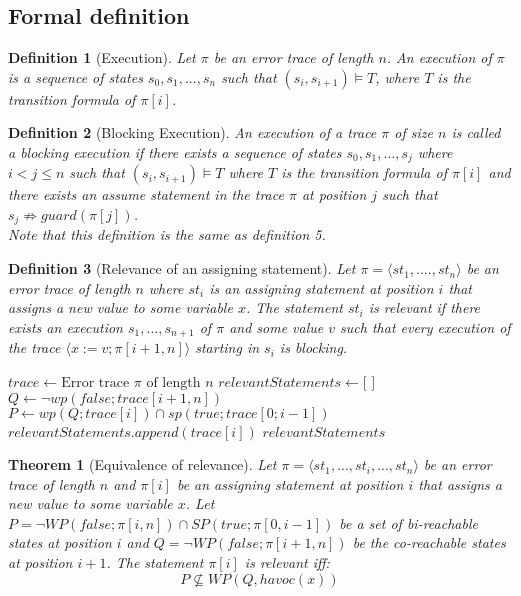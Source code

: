 \documentclass{article}
\newcommand{\limp}{\Rightarrow}
\newtheorem{mydef}{Definition}
\newtheorem{theorem}{Theorem}
\begin{document}
\subsection{Formal definition}
\begin{mydef}[Execution]\label{mydef:execution}
Let $\pi$ be an error trace of length $n$. An execution of $\pi$ is a sequence of states $s_0, s_1,...,s_n$ such that $(s_i, s_{i+1}) \vDash T$, where $T$ is the transition formula of $\pi[i]$.
\end{mydef}
\begin{mydef}[Blocking Execution]\label{mydef:blocked_execution}
An execution of a trace $\pi$ of size $n$ is called a \emph{blocking execution} if there exists a sequence of states $s_0,s_1,...,s_j$ where $i<j \leq n$ such that $(s_i, s_{i+1}) \vDash T$ where $T$ is the transition formula of $\pi[i]$ and there exists an assume statement in the trace $\pi$ at position $j$ such that $s_j \not \limp guard(\pi[j])$. 
\\ Note that this definition is the same as definition 5.
\end{mydef}

\begin{mydef}[Relevance of an assigning statement]\label{mydef:responsible}
Let $\pi = \langle st_1,....,st_n \rangle$ be an error trace of length $n$ where $st_i$ is an assigning statement at position $i$ that assigns a new value to some variable $x$. The statement $st_i$ is relevant if there exists an execution $s_1,...,s_{n+1}$ of $\pi$ and some value $v$ such that every execution of the trace $\langle x:=v; \pi[i+1,n] \rangle$ starting in $s_i$ is blocking.
\end{mydef}

\begin{algorithm}
\caption{Relevance of an assigning statement}\label{relevance}
\begin{algorithmic}[1]
\State $trace \gets \text{Error trace } \pi \text{ of length } \textit{n}$
\State $relevantStatements \gets \text{[ ]}$
\State $Q \gets \neg wp(false;trace[i+1,n])$
\State $P \gets wp(Q; trace[i]) \cap sp(true; trace[0;i-1])$
\State $relevantStatements.append(trace[i])$
\EndIf
\EndFor
\Return $relevantStatements$
\EndProcedure
\end{algorithmic}
\end{algorithm}
\begin{theorem}[Equivalence of relevance]\label{mydef:relevancytheorem}
Let $\pi = \langle st_1,...,st_i,...,st_n \rangle$ be an error trace of length $n$ and $\pi[i]$ be an assigning statement at position $i$ that assigns a new value to some variable $x$. Let $P = \neg WP(false; \pi[i,n]) \cap SP(true; \pi[0,i-1])$ be a set of bi-reachable states at position $i$ and $Q =  \neg WP(false; \pi[i+1,n])$ be the co-reachable states at position $i+1$. The statement $\pi[i]$ is relevant iff:
 $$P \not \subseteq WP(Q,havoc(x))$$
\end{theorem}
\end{document}
